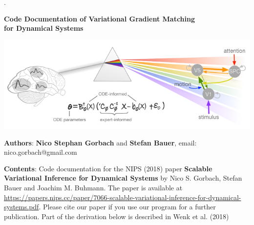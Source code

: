 \begin{center}

{.}
  \vspace{3cm}

  \thispagestyle{empty}

  
  {\LARGE\bf Code Documentation of Variational Gradient Matching\\ \vspace{0.3cm} for Dynamical Systems}
  
  \thispagestyle{empty}
             


  \vspace{1.2cm}

\includegraphics[width=6in]{cover_pic.png}
\end{center}
\vspace{2cm}
 {\Large \textbf{Authors}:\vspace{0.4cm}
\newline \textbf{Nico Stephan Gorbach} and \textbf{Stefan Bauer}, email: nico.gorbach@gmail.com}

\vspace{4cm}
{{\Large\textbf{Contents}:}\vspace{0.4cm}
\newline Code documentation for the NIPS (2018) paper \textbf{Scalable Variational Inference for Dynamical Systems} by Nico S. Gorbach, Stefan Bauer and Joachim M. Buhmann. The paper is available at \url{https://papers.nips.cc/paper/7066-scalable-variational-inference-for-dynamical-systems.pdf}. Please cite our paper if you use our program for a further publication. Part of the derivation below is described in Wenk et al. (2018)}


